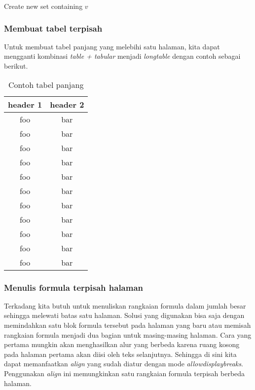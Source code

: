 \begin{algorithm}                     
	\begin{algorithmic} [1]                   
		\State Create new set containing $v$
		\EndProcedure
	\end{algorithmic}
\end{algorithm}


\subsubsection{Membuat tabel terpisah}

Untuk membuat tabel panjang yang melebihi satu halaman, kita dapat mengganti kombinasi \textit{table + tabular} menjadi \textit{longtable} dengan contoh sebagai berikut.

\begin{longtable}{| c | c |} 
	\caption{Contoh tabel panjang}
	\label{tab:myfirstlongtable} \\
	\hline
	header 1 & header 2 \\
	\hline \hline
	foo & bar \\ \hline 
	foo & bar \\ \hline
	foo & bar \\ \hline
	foo & bar \\ \hline
	foo & bar \\ \hline
	foo & bar \\ \hline
	foo & bar \\ \hline
	foo & bar \\ \hline
	foo & bar \\ \hline
	foo & bar \\ \hline
	foo & bar \\ \hline
\end{longtable}


\subsubsection{Menulis formula terpisah halaman}

Terkadang kita butuh untuk menuliskan rangkaian formula dalam jumlah besar sehingga melewati batas satu halaman. Solusi yang digunakan bisa saja dengan memindahkan satu blok formula tersebut pada halaman yang baru atau memisah rangkaian formula menjadi dua bagian untuk masing-masing halaman. Cara yang pertama mungkin akan menghasilkan alur yang berbeda karena ruang kosong pada halaman pertama akan diisi oleh teks selanjutnya. Sehingga di sini kita dapat memanfaatkan \textit{align} yang sudah diatur dengan mode \textit{allowdisplaybreaks}. Penggunakan \textit{align} ini memungkinkan satu rangkaian formula terpisah berbeda halaman. 

